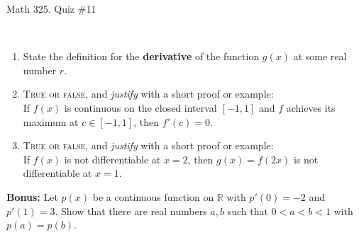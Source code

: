 \documentclass[12pt]{amsart}
\newcommand{\R}{\mathbb{R}}
\begin{document}
	
	\thispagestyle{empty}
	
	\begin{center}
		\Large{Math 325. Quiz \#11 }\\

	\end{center}
	
	\
	
\begin{enumerate}
		\item State the definition for the \textbf{derivative} of the function $g(x)$ at some real number $r$.
		\vfill
		\vfill



	
\item  \textsc{True or false}, and \emph{justify} with a short proof or example:\\
If $f(x)$ is continuous on the closed interval $[-1,1]$ and $f$ achieves its maximum at $c\in [-1,1]$, then $f'(c)=0$.
\vfill\vfill\vfill



\item  \textsc{True or false}, and \emph{justify} with a short proof or example:\\
If $f(x)$ is not differentiable at $x=2$, then $g(x)= f(2x)$ is not differentiable at $x=1$.


	
	\vfill	\vfill\vfill
	

	





\end{enumerate}




\newpage

\noindent \textbf{Bonus:} Let $p(x)$ be a continuous function on $\R$ with $p'(0)=-2$ and $p'(1)=3$. Show that there are real numbers $a,b$ such that $0<a<b<1$ with $p(a)=p(b)$.	
	
\end{document}
